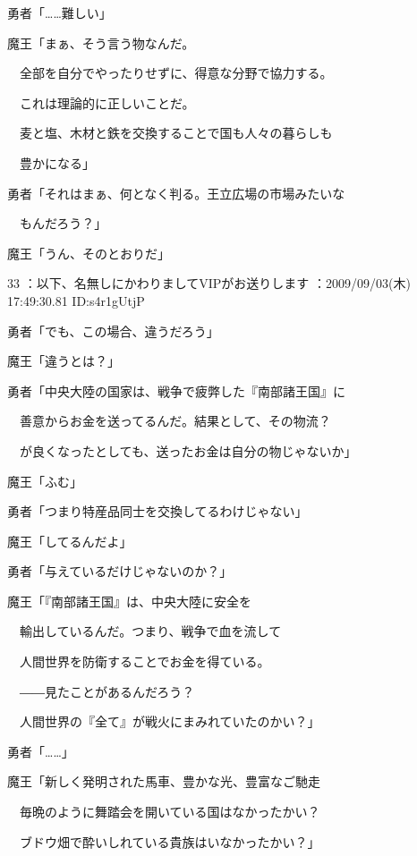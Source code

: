\documentclass[a4j,twocolumn]{tarticle}
\begin{document}
勇者「……難しい」\par{} 
魔王「まぁ、そう言う物なんだ。\par{} 
　全部を自分でやったりせずに、得意な分野で協力する。\par{} 
　これは理論的に正しいことだ。\par{} 
　麦と塩、木材と鉄を交換することで国も人々の暮らしも \par{}
　豊かになる」 



勇者「それはまぁ、何となく判る。王立広場の市場みたいな\par{}
　もんだろう？」 



魔王「うん、そのとおりだ」

	 

	

33 ：以下、名無しにかわりましてVIPがお送りします ：2009/09/03(木) 17:49:30.81 ID:s4r1gUtjP 


勇者「でも、この場合、違うだろう」\par{} 
魔王「違うとは？」 



勇者「中央大陸の国家は、戦争で疲弊した『南部諸王国』に \par{}
　善意からお金を送ってるんだ。結果として、その物流？\par{} 
　が良くなったとしても、送ったお金は自分の物じゃないか」\par{} 
魔王「ふむ」 



勇者「つまり特産品同士を交換してるわけじゃない」 



魔王「してるんだよ」 



勇者「与えているだけじゃないのか？」 



魔王「『南部諸王国』は、中央大陸に安全を\par{} 
　輸出しているんだ。つまり、戦争で血を流して\par{} 
　人間世界を防衛することでお金を得ている。 \par{}
　――見たことがあるんだろう？\par{} 
　人間世界の『全て』が戦火にまみれていたのかい？」 



勇者「……」 



魔王「新しく発明された馬車、豊かな光、豊富なご馳走 \par{}
　毎晩のように舞踏会を開いている国はなかったかい？\par{} 
　ブドウ畑で酔いしれている貴族はいなかったかい？」 
\end{document}
